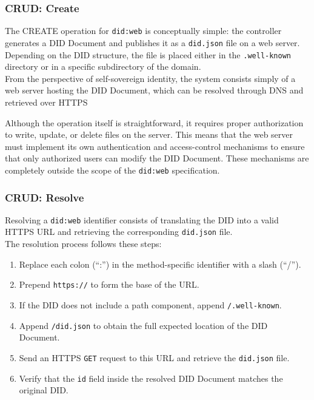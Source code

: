 \subsubsection *{CRUD: Create}
The CREATE operation for \texttt{did:web} is conceptually simple: the controller generates a DID Document and publishes it as a \texttt{did.json} file on a web server. \\
Depending on the DID structure, the file is placed either in the \texttt{.well-known} directory or in a specific subdirectory of the domain.\\
From the perspective of self-sovereign identity, the system consists simply of a web server hosting the DID Document, which can be resolved through DNS and retrieved over HTTPS
\medskip

\noindent
Although the operation itself is straightforward, it requires proper authorization to write, update, or delete files on the server. This means that the web server must implement its own authentication and access-control mechanisms to ensure that only authorized users can modify the DID Document. These mechanisms are completely outside the scope of the \texttt{did:web} specification.

\subsubsection*{CRUD: Resolve}

Resolving a \texttt{did:web} identifier consists of translating the DID into a valid HTTPS URL and retrieving the corresponding \texttt{did.json} file.\\
The resolution process follows these steps:
\begin{enumerate}
    \item Replace each colon (``:'') in the method-specific identifier with a slash (``/'').
    \item Prepend \texttt{https://} to form the base of the URL.
    \item If the DID does not include a path component, append \texttt{/.well-known}.
    \item Append \texttt{/did.json} to obtain the full expected location of the DID Document.
    \item Send an HTTPS \texttt{GET} request to this URL and retrieve the \texttt{did.json} file.
    \item Verify that the \texttt{id} field inside the resolved DID Document matches the original DID.
\end{enumerate}

